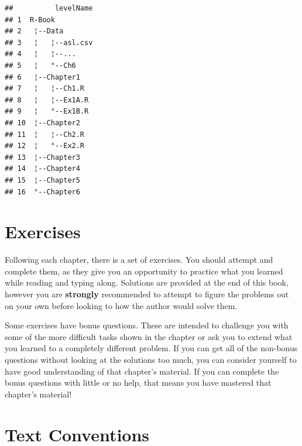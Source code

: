 \documentclass[]{book}
\theoremstyle{definition}
\theoremstyle{definition}
\theoremstyle{definition}
\theoremstyle{remark}
\begin{document}
\begin{verbatim}
##          levelName
## 1  R-Book         
## 2   ¦--Data       
## 3   ¦   ¦--asl.csv
## 4   ¦   ¦--...    
## 5   ¦   °--Ch6    
## 6   ¦--Chapter1   
## 7   ¦   ¦--Ch1.R  
## 8   ¦   ¦--Ex1A.R 
## 9   ¦   °--Ex1B.R 
## 10  ¦--Chapter2   
## 11  ¦   ¦--Ch2.R  
## 12  ¦   °--Ex2.R  
## 13  ¦--Chapter3   
## 14  ¦--Chapter4   
## 15  ¦--Chapter5   
## 16  °--Chapter6
\end{verbatim}

\section*{Exercises}\label{exercises}

Following each chapter, there is a set of exercises. You should attempt
and complete them, as they give you an opportunity to practice what you
learned while reading and typing along. Solutions are provided at the
end of this book, however you are \textbf{strongly} recommended to
attempt to figure the problems out on your own before looking to how the
author would solve them.

Some exercises have bonus questions. These are intended to challenge you
with some of the more difficult tasks shown in the chapter or ask you to
extend what you learned to a completely different problem. If you can
get all of the non-bonus questions without looking at the solutions too
much, you can consider yourself to have good understanding of that
chapter's material. If you can complete the bonus questions with little
or no help, that means you have mastered that chapter's material!

\hypertarget{notation}{\section*{Text Conventions}\label{notation}}
\end{document}
